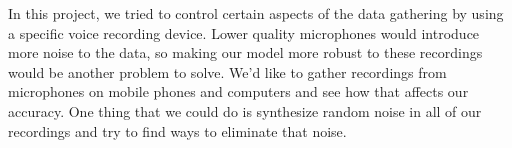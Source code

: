 \documentclass{article}
\begin{document}
In this project, we tried to control certain aspects of the data gathering by using a specific voice recording device. Lower quality microphones would introduce more noise to the data, so making our model more robust to these recordings would be another problem to solve. We'd like to gather recordings from microphones on mobile phones and computers and see how that affects our accuracy. One thing that we could do is synthesize random noise in all of our recordings and try to find ways to eliminate that noise.

\appendix




\end{document}
